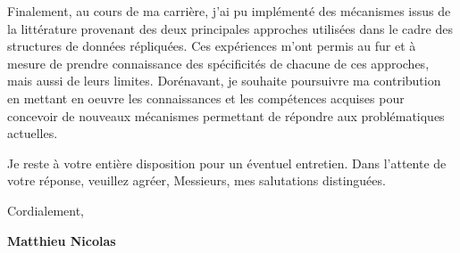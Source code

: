 \documentclass[11pt,a4paper,sans]{moderncv}        %
\newcommand{\tab}{\quad \quad}
\begin{document}

\tab Finalement, au cours de ma carrière, j'ai pu implémenté des mécanismes issus de la littérature
provenant des deux principales approches utilisées dans le cadre des structures de données répliquées.
Ces expériences m'ont permis au fur et à mesure de prendre connaissance
des spécificités de chacune de ces approches, mais aussi de leurs limites.
Dorénavant, je souhaite poursuivre ma contribution en mettant en oeuvre les connaissances et les compétences acquises
pour concevoir de nouveaux mécanismes permettant de répondre aux problématiques actuelles.

\tab Je reste à votre entière disposition pour un éventuel entretien. Dans l'attente de votre réponse, veuillez agréer, Messieurs, mes salutations distinguées.


Cordialement,
\begin{flushright}
\textbf{Matthieu Nicolas}
\end{flushright}
\end{document}
